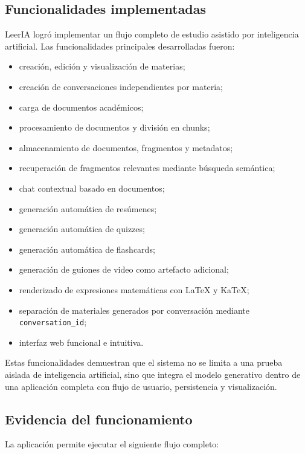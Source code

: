 \documentclass[12pt, letterpaper]{article}
\begin{document}
	\subsection{Funcionalidades implementadas}
	
	LeerIA logró implementar un flujo completo de estudio asistido por inteligencia artificial. Las funcionalidades principales desarrolladas fueron:
	
	\begin{itemize}
		\item creación, edición y visualización de materias;
		\item creación de conversaciones independientes por materia;
		\item carga de documentos académicos;
		\item procesamiento de documentos y división en chunks;
		\item almacenamiento de documentos, fragmentos y metadatos;
		\item recuperación de fragmentos relevantes mediante búsqueda semántica;
		\item chat contextual basado en documentos;
		\item generación automática de resúmenes;
		\item generación automática de quizzes;
		\item generación automática de flashcards;
		\item generación de guiones de video como artefacto adicional;
		\item renderizado de expresiones matemáticas con LaTeX y KaTeX;
		\item separación de materiales generados por conversación mediante \texttt{conversation\_id};
		\item interfaz web funcional e intuitiva.
	\end{itemize}
	
	Estas funcionalidades demuestran que el sistema no se limita a una prueba aislada de inteligencia artificial, sino que integra el modelo generativo dentro de una aplicación completa con flujo de usuario, persistencia y visualización.
	
	\subsection{Evidencia del funcionamiento}
	
	La aplicación permite ejecutar el siguiente flujo completo:
	
\end{document}
